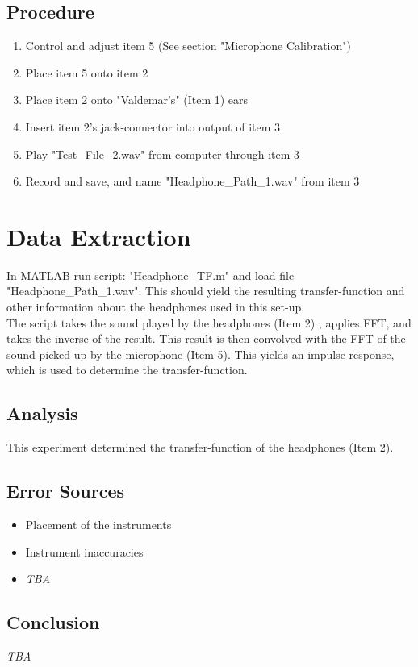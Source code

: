 \subsection{Procedure}
\begin{enumerate}
	\item Control and adjust item 5 (See section "Microphone Calibration")
	\item Place item 5 onto item 2
	\item Place item 2 onto "Valdemar's" (Item 1) ears
	\item Insert item 2's jack-connector into output of item 3
	\item Play "Test\_File\_2.wav" from computer through item 3
	\item Record and save, and name "Headphone\_Path\_1.wav" from item 3
\end{enumerate}

\section{Data Extraction}
In MATLAB\textsuperscript{\textregistered} run script: "Headphone\_TF.m" and load file "Headphone\_Path\_1.wav". This should yield the resulting transfer-function and other information about the headphones used in this set-up.\\
\indent The script takes the sound played by the headphones (Item 2) , applies FFT, and takes the inverse of the result. This result is then convolved with the FFT of the sound picked up by the microphone (Item 5). This yields an impulse response, which is used to determine the transfer-function.

\subsection{Analysis}
This experiment determined the transfer-function of the headphones (Item 2).

\subsection{Error Sources}
\begin{itemize}
	\item Placement of the instruments
	\item Instrument inaccuracies 
	\item \textit{TBA}
\end{itemize}

\subsection{Conclusion}
\textit{TBA}